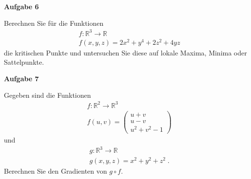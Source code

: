 \documentclass[a4paper,13pt]{scrartcl}
\begin{document}
\vspace{8mm}
{\bf Aufgabe 6}

Berechnen Sie für die Funktionen 
\begin{align*}
& f :  \mathbb{R}^3 \to \mathbb{R} \\
& f(x,y,z) = 2x^2 + y^4 + 2z^2 + 4yz
\end{align*}
die kritischen Punkte und untersuchen Sie diese auf lokale Maxima, Minima oder Sattelpunkte.
\vspace{8mm}

{\bf Aufgabe 7}

Gegeben sind  die Funktionen 
\begin{align*}
& f :  \mathbb{R}^2  \to \mathbb{R}^3 \\
& f(u,v) = \begin{pmatrix}  u +v \\ u -v \\ u^2 + v^2 -1  \end{pmatrix}
\end{align*}
und 
\begin{align*}
& g :  \mathbb{R}^3  \to \mathbb{R} \\
& g(x,y,z) = x^2 + y^2 + z^2 \;. 
\end{align*}
Berechnen Sie den Gradienten von $g \circ f$.
\end{document}
